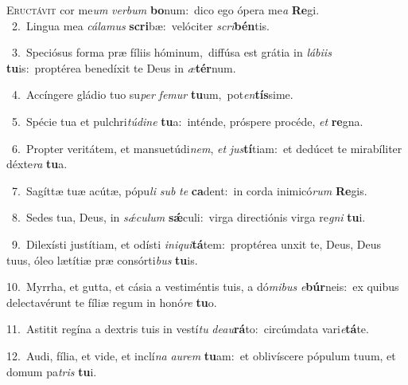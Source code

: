 \lettrine{\initial\textcolor{\initialcolor}{E}}{ructávit} cor me\textit{um} \textit{ver}\-\textit{bum} \textbf{bo}\-num:~\star dico ego ópera me\textit{a} \textbf{Re}\-gi.\\
{\numbfont\textcolor{\numbcolor}{~2.}}~Lingua mea \textit{cá}\-\textit{la}\textit{mus} \textbf{scri}\-bæ:~\star velóciter \textit{scri}\-\textbf{bén}tis.\par
{\numbfont\textcolor{\numbcolor}{~3.}}~Speciósus forma præ fíliis hóminum,~\dagger diffúsa est grátia in \textit{lá}\-\textit{bi}\textit{is} \textbf{tu}\-is:~\star proptérea benedíxit te Deus in \textit{æ}\-\textbf{tér}num.\par
{\numbfont\textcolor{\numbcolor}{~4.}}~Accíngere gládio tuo su\textit{per} \textit{fe}\-\textit{mur} \textbf{tu}\-um,~\star pot\-\textit{en}\-\textbf{tís}sime.\par
{\numbfont\textcolor{\numbcolor}{~5.}}~Spécie tua et pulchri\-\textit{tú}\-\textit{di}\textit{ne} \textbf{tu}\-a:~\star inténde, próspere procéde, \textit{et} \textbf{re}\-gna.\par
{\numbfont\textcolor{\numbcolor}{~6.}}~Propter veritátem, et mansuetúdi\-\textit{nem}\-, \textit{et} \textit{jus}\-\textbf{tí}tiam:~\star et dedúcet te mirabíliter déxte\textit{ra} \textbf{tu}\-a.\par
{\numbfont\textcolor{\numbcolor}{~7.}}~Sagíttæ tuæ acútæ, pópu\textit{li} \textit{sub} \textit{te} \textbf{ca}\-dent:~\star in corda inimicó\textit{rum} \textbf{Re}\-gis.\par
{\numbfont\textcolor{\numbcolor}{~8.}}~Sedes tua, Deus, in \textit{sǽ}\-\textit{cu}\textit{lum} \textbf{sǽ}\-culi:~\star virga directiónis virga re\textit{gni} \textbf{tu}\-i.\par
{\numbfont\textcolor{\numbcolor}{~9.}}~Dilexísti justítiam, et odísti \textit{in}\-\textit{i}\textit{qui}\textbf{tá}tem:~\star proptérea unxit te, Deus, Deus tuus, óleo lætítiæ præ consórti\textit{bus} \textbf{tu}\-is.\par
{\numbfont\textcolor{\numbcolor}{10.}}~Myrrha, et gutta, et cásia a vestiméntis tuis, a dó\-\textit{mi}\-\textit{bus} \textit{e}\-\textbf{búr}neis:~\star ex quibus delectavérunt te fíliæ regum in honó\textit{re} \textbf{tu}\-o.\par
{\numbfont\textcolor{\numbcolor}{11.}}~Astitit regína a dextris tuis in vestí\textit{tu} \textit{de}\-\textit{au}\textbf{rá}to:~\star circúmdata vari\-\textit{e}\-\textbf{tá}te.\par
{\numbfont\textcolor{\numbcolor}{12.}}~Audi, fília, et vide, et inclí\textit{na} \textit{au}\-\textit{rem} \textbf{tu}\-am:~\star et oblivíscere pópulum tuum, et domum pa\textit{tris} \textbf{tu}\-i.\par
